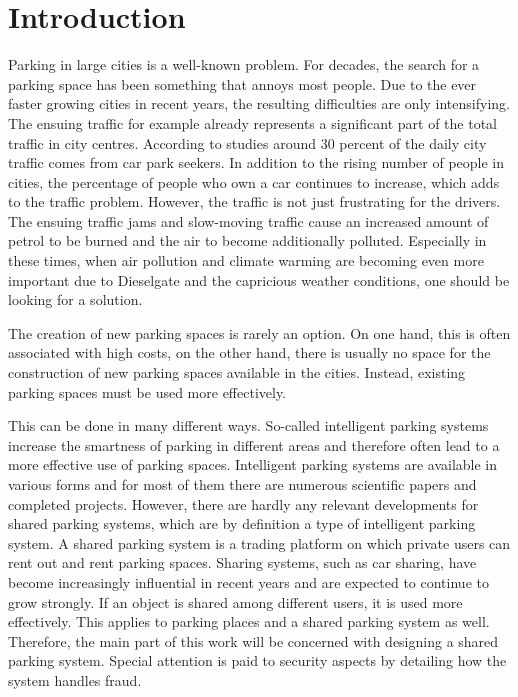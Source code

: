 \chapter{Introduction}
\label{ch:Introduction}
Parking in large cities is a well-known problem. For decades, the search for a parking space has been something that annoys most people. Due to the ever faster growing cities in recent years, the resulting difficulties are only intensifying. The ensuing traffic for example already represents a significant part of the total traffic in city centres. According to studies around 30 percent of the daily city traffic comes from car park seekers.\cite{shoup2006cruising} In addition to the rising number of people in cities, the percentage of people who own a car continues to increase, which adds to the traffic problem. However, the traffic is not just frustrating for the drivers. The ensuing traffic jams and slow-moving traffic cause an increased amount of petrol to be burned and the air to become additionally polluted. Especially in these times, when air pollution and climate warming are becoming even more important due to Dieselgate and the capricious weather conditions, one should be looking for a solution.

The creation of new parking spaces is rarely an option. On one hand, this is often associated with high costs, on the other hand, there is usually no space for the construction of new parking spaces available in the cities. Instead, existing parking spaces must be used more effectively.

This can be done in many different ways. So-called intelligent parking systems increase the smartness of parking in different areas and therefore often lead to a more effective use of parking spaces. Intelligent parking systems are available in various forms and for most of them there are numerous scientific papers and completed projects. However, there are hardly any relevant developments for shared parking systems, which are by definition a type of intelligent parking system. A shared parking system is a trading platform on which private users can rent out and rent parking spaces. Sharing systems, such as car sharing, have become increasingly influential in recent years and are expected to continue to grow strongly. If an object is shared among different users, it is used more effectively. This applies to parking places and a shared parking system as well. Therefore, the main part of this work will be concerned with designing a shared parking system. Special attention is paid to security aspects by detailing how the system handles fraud.


